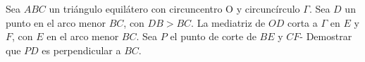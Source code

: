 Sea $ABC$ un triángulo equilátero con circuncentro O y circuncírculo $\Gamma$. Sea $D$ un punto en el arco menor $BC$, con $DB\gt BC$. La mediatriz de $OD$ corta a $\Gamma$ en $E$ y $F$, con $E$ en el arco menor $BC$. Sea $P$ el punto de corte de $BE$ y $CF$- Demostrar que $PD$ es perpendicular a $BC$.